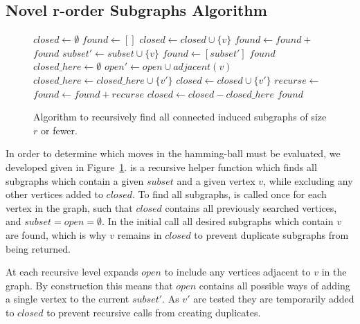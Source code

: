 \documentclass{sig-alternate}
\begin{document}
\subsection{Novel r-order Subgraphs Algorithm}
\begin{figure}
  \begin{algorithmic}[1]
    \State $closed \leftarrow \emptyset$
    \State $found \leftarrow []$
      \State $closed \leftarrow closed \cup \{v\}$
      \State $found \leftarrow found + $
    \EndFor
    \State \Return $found$
  \EndProcedure
    \State $subset' \leftarrow subset \cup \{v\}$
    \State $found \leftarrow [subset']$
      \Return $found$
    \EndIf
    \State $closed\_here \leftarrow \emptyset$
    \State $open' \leftarrow open \cup adjacent(v)$
        \State $closed\_here \leftarrow closed\_here \cup \{v'\}$
        \State $closed \leftarrow closed \cup \{v'\}$
        \State $recurse \leftarrow $
        \State $found \leftarrow found + recurse$
    \EndFor
    \State $closed \leftarrow closed - closed\_here$
    \State \Return $found$
  \EndProcedure
\end{algorithmic}
  \caption{Algorithm to recursively find all connected induced subgraphs of size $r$ or fewer.}
  \label{fig-connected-subgraphs}
\end{figure}

In order to determine which moves in the hamming-ball must be evaluated,
we developed  given in Figure~\ref{fig-connected-subgraphs}.
 is a recursive helper function which finds all subgraphs
which contain a given $subset$ and a given vertex $v$, while excluding
any other vertices added to $closed$. To find all subgraphs, 
is called once for each vertex in the graph, such that $closed$ contains
all previously searched vertices, and $subset=open=\emptyset$. In the initial
call all desired subgraphs which contain $v$ are found, which is why $v$ remains
in $closed$ to prevent duplicate subgraphs from being returned.

At each recursive level  expands $open$ to include any vertices
adjacent to $v$ in the graph. By construction this means that $open$ contains
all possible ways of adding a single vertex to the current $subset'$. As $v'$
are tested they are temporarily added to $closed$ to prevent recursive calls
from creating duplicates.
\end{document}
